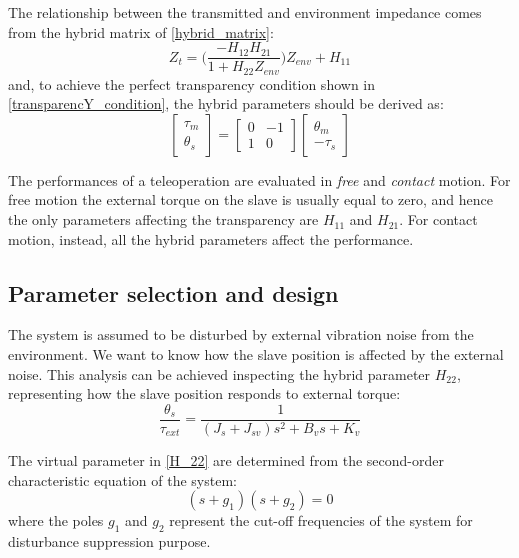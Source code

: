 The relationship between the transmitted and environment impedance comes from the hybrid matrix of \eqref{hybrid_matrix}:
\begin{equation}
	Z_t = \big(\dfrac{-H_{12} H_{21}}{1 + H_{22} Z_{env}}\big)Z_{env} + H_{11}
\end{equation}
and, to achieve the perfect transparency condition shown in \eqref{transparencY_condition}, the hybrid parameters should be derived as:
\begin{equation}
	\begin{bmatrix}
	\tau_m \\ \theta_s
	\end{bmatrix} = 
	\begin{bmatrix}
	0 & -1 \\ 1 & 0
	\end{bmatrix}
	\begin{bmatrix}
	\theta_m \\ -\tau_s
	\end{bmatrix}
\end{equation}

The performances of a teleoperation are evaluated in \emph{free} and \emph{contact} motion. For free motion the external torque on the slave is usually equal to zero, and hence the only parameters affecting the transparency are $ H_{11} $ and $ H_{21} $. For contact motion, instead, all the hybrid parameters affect the performance.

\subsection{Parameter selection and design}\label{ParamSelect} 

The system is assumed to be disturbed by external vibration noise from the environment. We want to know how the slave position is affected by the external noise. This analysis can be achieved inspecting the hybrid parameter $ H_{22} $, representing how the slave position responds to external torque:
\begin{equation}
	\dfrac{\theta_s}{\tau_{ext}} = \dfrac{1}{(J_s + J_{sv}) s^2 + B_v s + K_v}
	\label{H_22}
\end{equation}

The virtual parameter in \eqref{H_22} are determined from the second-order characteristic equation of the system:
\begin{equation}
	(s + g_1)(s + g_2) = 0
	\label{charact_equation}
\end{equation}  
where the poles $ g_1 $ and $ g_2 $ represent the cut-off frequencies of the system for disturbance suppression purpose.

